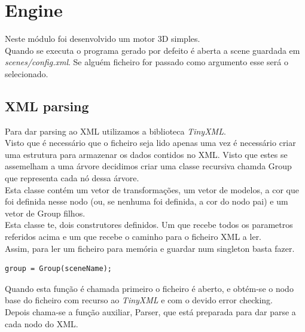 \documentclass[a4paper]{report}
\begin{document}
\chapter{Engine}
Neste módulo foi desenvolvido um motor 3D simples.\\
Quando se executa o programa gerado por defeito é aberta a scene guardada em
\textit{scenes/config.xml}. Se alguém ficheiro for passado como argumento esse
será o selecionado.\\

\section{XML parsing}
Para dar parsing ao XML utilizamos a biblioteca \textit{TinyXML}.\\
Visto que é necessário que o ficheiro seja lido apenas uma vez é necessário
criar uma estrutura para armazenar os dados contidos no XML. Visto que estes se
assemelham a uma árvore decidimos criar uma classe recursiva chamda Group que
representa cada nó dessa árvore.\\
Esta classe contém um vetor de transformações, um vetor de modelos, a cor que
foi definida nesse nodo (ou, se nenhuma foi definida, a cor do nodo pai) e um
vetor de Group filhos.\\
Esta classe te, dois construtores definidos. Um que recebe todos os parametros
referidos acima e um que recebe o caminho para o ficheiro XML a ler.\\
Assim, para ler um ficheiro para memória e guardar num singleton basta fazer.

\begin{lstlisting}
group = Group(sceneName);
\end{lstlisting}
Quando esta função é chamada primeiro o ficheiro é aberto, e obtém-se o nodo
base do ficheiro com recurso ao \textit{TinyXML} e com o devido error
checking.\\
Depois chama-se a função auxiliar, Parser, que está preparada para dar parse a
cada nodo do XML.
\end{document}
